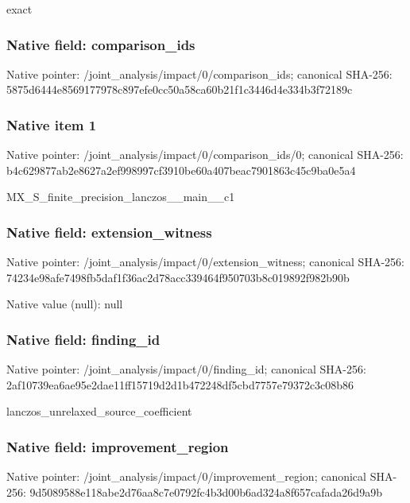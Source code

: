 \documentclass[10pt,a4paper]{article}
\begin{document}
\begingroup\raggedright\sloppy exact\par\endgroup

\subsubsection{Native field: comparison\_\allowbreak{}ids}
Native pointer: /joint\_\allowbreak{}analysis/impact/0/comparison\_\allowbreak{}ids; canonical SHA-256: 5875d6444e8569177978c897efe0cc50a58ca60b21f1c3446d4e334b3f72189c

\subsubsection{Native item 1}
Native pointer: /joint\_\allowbreak{}analysis/impact/0/comparison\_\allowbreak{}ids/0; canonical SHA-256: b4c629877ab2e8627a2ef998997cf3910be60a407beac7901863c45c9ba0e5a4

\begingroup\raggedright\sloppy MX\_\allowbreak{}S\_\allowbreak{}finite\_\allowbreak{}precision\_\allowbreak{}lanczos\_\allowbreak{}\_\allowbreak{}main\_\allowbreak{}\_\allowbreak{}c1\par\endgroup

\subsubsection{Native field: extension\_\allowbreak{}witness}
Native pointer: /joint\_\allowbreak{}analysis/impact/0/extension\_\allowbreak{}witness; canonical SHA-256: 74234e98afe7498fb5daf1f36ac2d78acc339464f950703b8c019892f982b90b

Native value (null): null

\subsubsection{Native field: finding\_\allowbreak{}id}
Native pointer: /joint\_\allowbreak{}analysis/impact/0/finding\_\allowbreak{}id; canonical SHA-256: 2af10739ea6ae95e2dae11ff15719d2d1b472248df5cbd7757e79372c3c08b86

\begingroup\raggedright\sloppy lanczos\_\allowbreak{}unrelaxed\_\allowbreak{}source\_\allowbreak{}coefficient\par\endgroup

\subsubsection{Native field: improvement\_\allowbreak{}region}
Native pointer: /joint\_\allowbreak{}analysis/impact/0/improvement\_\allowbreak{}region; canonical SHA-256: 9d5089588e118abe2d76aa8c7e0792fc4b3d00b6ad324a8f657cafada26d9a9b
\end{document}
